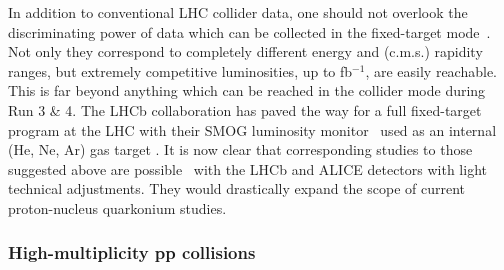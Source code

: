 \documentclass[../report.tex]{subfiles}
\begin{document}

In addition to conventional LHC collider data, one should not overlook the discriminating power of data which can be collected in the fixed-target mode~\cite{Brodsky:2012vg,Lansberg:2012kf}. Not only they correspond to completely different energy and (c.m.s.) rapidity ranges, but extremely competitive luminosities, up to fb$^{-1}$, are easily reachable. This is far beyond anything which can be reached in the collider mode during Run 3 \& 4. The LHCb collaboration has paved the way for a full fixed-target program at the LHC with their SMOG luminosity monitor~\cite{FerroLuzzi:2005em} used as an internal (He, Ne, Ar) gas target \cite{Aaij:2018ogq}. It is now clear that corresponding studies to those suggested above are possible~\cite{Hadjidakis:2018ifr} with the LHCb and ALICE detectors with light technical adjustments. They would drastically expand the scope of current proton-nucleus quarkonium studies.

\subsubsection{High-multiplicity pp collisions} %
\end{document}
